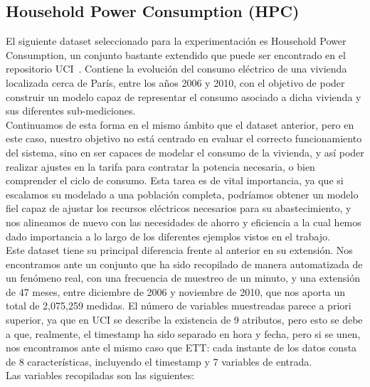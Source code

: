\subsection{Household Power Consumption (HPC)}

El siguiente dataset seleccionado para la experimentación es Household Power Consumption, un conjunto bastante extendido que puede ser encontrado en el repositorio UCI~\cite{hebrail2006individual}. Contiene la evolución del consumo eléctrico de una vivienda localizada cerca de París, entre los años 2006 y 2010, con el objetivo de poder construir un modelo capaz de representar el consumo asociado a dicha vivienda y sus diferentes sub-mediciones.\\

Continuamos de esta forma en el mismo ámbito que el dataset anterior, pero en este caso, nuestro objetivo no está centrado en evaluar el correcto funcionamiento del sistema, sino en ser capaces de modelar el consumo de la vivienda, y así poder realizar ajustes en la tarifa para contratar la potencia necesaria, o bien comprender el ciclo de consumo. Esta tarea es de vital importancia, ya que si escalamos su modelado a una población completa, podríamos obtener un modelo fiel capaz de ajustar los recursos eléctricos necesarios para su abastecimiento, y nos alineamos de nuevo con las necesidades de ahorro y eficiencia a la cual hemos dado importancia a lo largo de los diferentes ejemplos vistos en el trabajo.\\

Este dataset tiene su principal diferencia frente al anterior en su extensión. Nos encontramos ante un conjunto que ha sido recopilado de manera automatizada de un fenómeno real, con una frecuencia de muestreo de un minuto, y una extensión de 47 meses, entre diciembre de 2006 y noviembre de 2010, que nos aporta un total de 2,075,259 medidas. El número de variables muestreadas parece a priori superior, ya que en UCI se describe la existencia de 9 atributos, pero esto se debe a que, realmente, el timestamp ha sido separado en hora y fecha, pero si se unen, nos encontramos ante el mismo caso que ETT: cada instante de los datos consta de 8 características, incluyendo el timestamp y 7 variables de entrada.\\

Las variables recopiladas son las siguientes:

